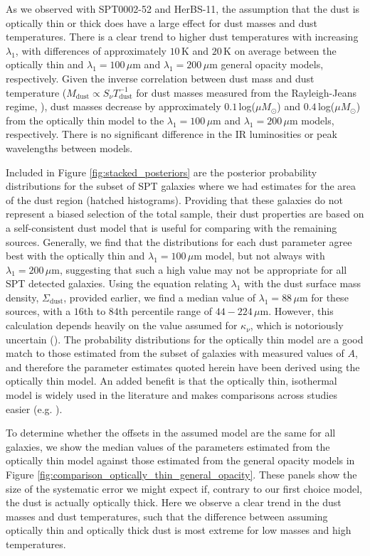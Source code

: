 As we observed with SPT0002-52 and HerBS-11, the assumption that the dust is optically thin or thick does have a large effect for dust masses and dust temperatures. There is a clear trend to higher dust temperatures with increasing $\lambda_1$, with differences of approximately $10\,$K and $20\,$K on average between the optically thin and $\lambda_1 = 100\,\mu$m and $\lambda_1 = 200\,\mu$m general opacity models, respectively. Given the inverse correlation between dust mass and dust temperature ($M_\textrm{dust} \propto S_\nu T_\textrm{dust}^{-1}$ for dust masses measured from the Rayleigh-Jeans regime, \citealt{Casey_2014b}), dust masses decrease by approximately $0.1\,$log($\mu M_\odot$) and $0.4\,$log($\mu M_\odot$) from the optically thin model to the $\lambda_1 = 100\,\mu$m and $\lambda_1 = 200\,\mu$m models, respectively. There is no significant difference in the IR luminosities or peak wavelengths between models.

Included in Figure \ref{fig:stacked_posteriors} are the posterior probability distributions for the subset of SPT galaxies where we had estimates for the area of the dust region (hatched histograms). Providing that these galaxies do not represent a biased selection of the total sample, their dust properties are based on a self-consistent dust model that is useful for comparing with the remaining sources. Generally, we find that the distributions for each dust parameter agree best with the optically thin and $\lambda_1 = 100\,\mu$m model, but not always with $\lambda_1 = 200\,\mu$m, suggesting that such a high value may not be appropriate for all SPT detected galaxies. Using the equation relating $\lambda_1$ with the dust surface mass density, $\Sigma_\textrm{dust}$, provided earlier, we find a median value of $\lambda_1 = 88\,\mu$m for these sources, with a $16$th to $84$th percentile range of $44 - 224\,\mu$m. However, this calculation depends heavily on the value assumed for $\kappa_\nu$, which is notoriously uncertain (\citealt{Clark_2016}). The probability distributions for the optically thin model are a good match to those estimated from the subset of galaxies with measured values of $A$, and therefore the parameter estimates quoted herein have been derived using the optically thin model. An added benefit is that the optically thin, isothermal model is widely used in the literature and makes comparisons across studies easier (e.g. \citealt{Magdis_2012, Simpson_2017, Lamperti_2019, Dudzeviciute_2020, Valentino_2020a, daCunha_2021}).

To determine whether the offsets in the assumed model are the same for all galaxies, we show the median values of the parameters estimated from the optically thin model against those estimated from the general opacity models in Figure \ref{fig:comparison_optically_thin_general_opacity}. These panels show the size of the systematic error we might expect if, contrary to our first choice model, the dust is actually optically thick. Here we observe a clear trend in the dust masses and dust temperatures, such that the difference between assuming optically thin and optically thick dust is most extreme for low masses and high temperatures.

